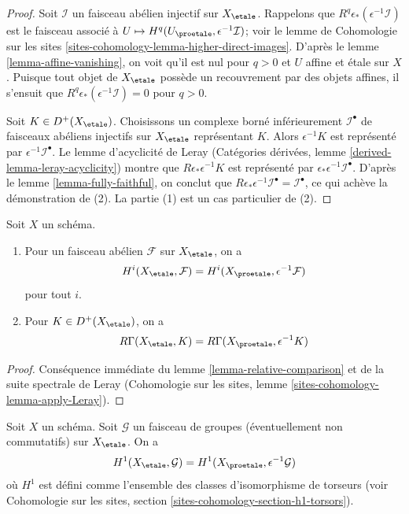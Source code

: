 \begin{proof}
Soit $\mathcal{I}$ un faisceau abélien injectif sur $X_\etale$.
Rappelons que $R^q\epsilon_*(\epsilon^{-1}\mathcal{I})$ est le faisceau associé
à $U \mapsto H^q(U_\proetale, \epsilon^{-1}\mathcal{I})$; voir le
lemme de Cohomologie sur les sites \ref{sites-cohomology-lemma-higher-direct-images}.
D'après le lemme \ref{lemma-affine-vanishing}, on voit qu'il est nul pour $q > 0$
et $U$ affine et \'etale sur $X$. Puisque tout objet de
$X_\etale$ possède un recouvrement par des objets affines, il s'ensuit que
$R^q\epsilon_*(\epsilon^{-1}\mathcal{I}) = 0$ pour $q > 0$.

\medskip\noindent
Soit $K \in D^+(X_\etale)$. Choisissons un complexe borné inférieurement $\mathcal{I}^\bullet$
de faisceaux abéliens injectifs sur $X_\etale$ représentant $K$.
Alors $\epsilon^{-1}K$ est représenté par $\epsilon^{-1}\mathcal{I}^\bullet$.
Le lemme d'acyclicité de Leray (Catégories dérivées, lemme
\ref{derived-lemma-leray-acyclicity}) montre que $R\epsilon_*\epsilon^{-1}K$
est représenté par $\epsilon_*\epsilon^{-1}\mathcal{I}^\bullet$.
D'après le lemme \ref{lemma-fully-faithful}, on conclut que
$R\epsilon_*\epsilon^{-1}\mathcal{I}^\bullet = \mathcal{I}^\bullet$,
ce qui achève la démonstration de (2). La partie (1) est un cas particulier de (2).
\end{proof}

\begin{lemma}
\label{lemma-compare-cohomology}
Soit $X$ un schéma.
\begin{enumerate}
\item Pour un faisceau abélien $\mathcal{F}$ sur $X_\etale$, on a
$$
H^i(X_\etale, \mathcal{F}) =
H^i(X_\proetale, \epsilon^{-1}\mathcal{F})
$$
pour tout $i$.
\item Pour $K \in D^+(X_\etale)$, on a
$$
R\Gamma(X_\etale, K) = R\Gamma(X_\proetale, \epsilon^{-1}K)
$$
\end{enumerate}
\end{lemma}

\begin{proof}
Conséquence immédiate du lemme \ref{lemma-relative-comparison} et de
la suite spectrale de Leray (Cohomologie sur les sites, lemme
\ref{sites-cohomology-lemma-apply-Leray}).
\end{proof}

\begin{lemma}
\label{lemma-compare-cohomology-nonabelian}
Soit $X$ un schéma. Soit $\mathcal{G}$ un faisceau de groupes (éventuellement
non commutatifs) sur $X_\etale$. On a
$$
H^1(X_\etale, \mathcal{G}) =
H^1(X_\proetale, \epsilon^{-1}\mathcal{G})
$$
où $H^1$ est défini comme l'ensemble des classes d'isomorphisme de
torseurs (voir
Cohomologie sur les sites, section \ref{sites-cohomology-section-h1-torsors}).
\end{lemma}

